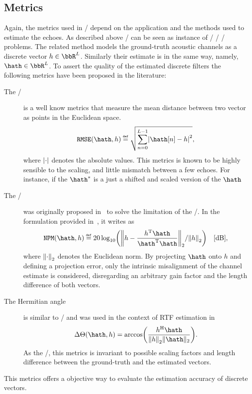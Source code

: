 

\subsection{Metrics}
Again, the metrics used in \AER/ depend on the application and the methods used to estimate the echoes.
As described above \AER/ can be seen as instance of \FIR/ \SIMO/ \BCE/ problems.
The related method models the ground-truth acoustic channels as a discrete vector $h \in \bbR^L$.
Similarly their estimate is in the same way, namely, $\hath \in \bbR^L$.
To assert the quality of the estimated discrete filters the following metrics have been proposed in the literature:
\begin{description}
    \item[The \RMSEtxt/] is a well know metrics that measure the mean distance between two vector as points in the Euclidean space.
    \begin{equation}
        \RMSE(\hath, h) \eqdef \sqrt{\sum_{n=0}^{L-1} \abs{\hath[n] - h}^2}
        ,
    \end{equation}
    where $\abs{\cdot}$ denotes the absolute values.
    This metrics is known to be highly sensible to the scaling, and little mismatch between a few echoes.
    For instance, if the $\hath^{*}$ is a just a shifted and scaled version of the $\hath$
    \item[The \NPMtxt/] was originally proposed in~ to solve the limitation of the \RMSEtxt/.
    In the formulation provided in~, it writes as
    \begin{equation}
        \NPM(\hath,h) \eqdef 20 \log_{10} \kparen{ \norm{h - \frac{\ktranspose{h}\hath}{\ktranspose{\hath} \hath}}_2 / \norm{h}_2} \quad \text{[dB]}
        ,
    \end{equation}
    where $\norm{\cdot}_2$ denotes the Euclidean norm.
    By projecting $\hath$ onto $h$ and defining a projection error, only the intrinsic misalignment of the channel estimate is considered, disregarding an arbitrary gain factor and the length difference of both vectors.

    \item[The Hermitian angle] is similar to \NPMtxt/ and was used in the context of RTF estimation in~
    \begin{equation}
        \Delta\Theta(\hath,h) = \arccos\kparen{\frac{\khermitian{h}\hath}{\norm{h}_2\|\hath\|_2}}
        .
    \end{equation}
    As the \NPMtxt/, this metrics is invariant to possible scaling factors and length difference between the ground-truth and the estimated vectors.
\end{description}
This metrics offers a objective way to evaluate the estimation accuracy of discrete vectors.

